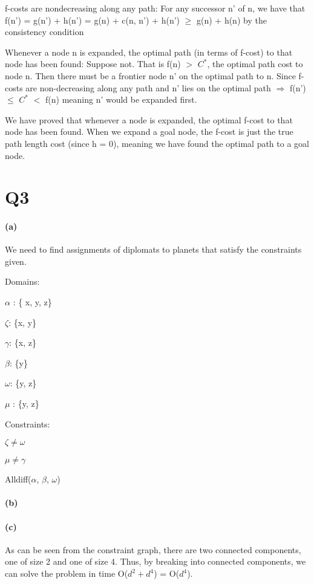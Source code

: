 \documentclass[11pt,a4paper]{article}
\begin{document}
f-costs are nondecreasing along any path: For any successor n' of n, we have that f(n') = g(n') + h(n') = g(n) + c(n, n') + h(n') $\geq$ g(n) + h(n) by the consistency condition

Whenever a node n is expanded, the optimal path (in terms of f-cost) to that node has been found: Suppose not. That is f(n) $>$ $C^{*}$, the optimal path cost to node n. Then there must be a frontier node n' on the optimal path to n. Since f-costs are non-decreasing along any path and n' lies on the optimal path $\Rightarrow$ f(n') $\leq$ $C^{*}$ $<$ f(n) meaning n' would be expanded first. 

We have proved that whenever a node is expanded, the optimal f-cost to that node has been found. When we expand a goal node, the f-cost is just the true path length cost (since h = 0), meaning we have found the optimal path to a goal node. 

\section*{Q3}

\paragraph*{(a)}
We need to find assignments of diplomats to planets that satisfy the constraints given.

Domains:

$\alpha$ : \{ x, y, z\}

$\zeta$: \{x, y\}

$\gamma$: \{x, z\}

$\beta$: \{y\}

$\omega$: \{y, z\}

$\mu$ : \{y, z\}

Constraints:

$\zeta \neq \omega$

$\mu \neq \gamma$

Alldiff($\alpha$, $\beta$, $\omega$)

\paragraph*{(b)}



\paragraph*{(c)}

As can be seen from the constraint graph, there are two connected components, one of size 2 and one of size 4. Thus, by breaking into connected components, we can solve the problem in time O($d^{2} + d^{4}$) = O($d^{4}$).
\end{document}
